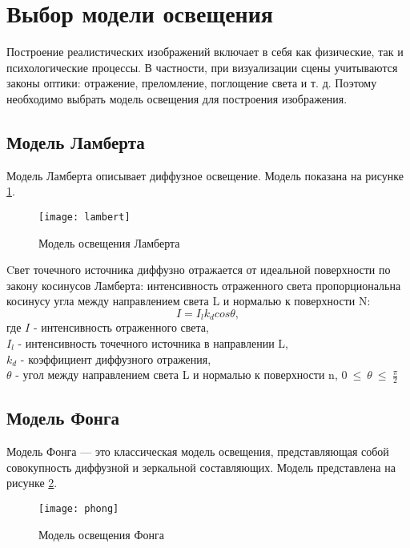\section{Выбор модели освещения}

Построение реалистических изображений включает в себя как физические,
так и психологические процессы. В частности, при визуализации сцены
учитываются законы оптики: отражение, преломление, поглощение света и т. д.
Поэтому необходимо выбрать модель освещения для построения изображения.

\subsection{Модель Ламберта}

Модель Ламберта описывает диффузное освещение. Модель показана на рисунке \ref{lambert}.

\begin{figure}[H]
	\centering
	\texttt{[image: lambert]}
	\caption{Модель освещения Ламберта}
	\label{lambert}
\end{figure}

Cвет точечного источника диффузно отражается от идеальной поверхности по закону косинусов Ламберта: интенсивность отраженного света пропорциональна косинусу угла между направлением света L и нормалью к поверхности N:
\begin{equation}\label{lambert_eq}
	I = I_l k_d cos \theta,
\end{equation}
где $I$ - интенсивность отраженного света,\\
\text{~~~~~}$I_l$ - интенсивность точечного источника в направлении L,\\
\text{~~~~~}$k_d$ - коэффициент диффузного отражения,\\
\text{~~~~~}$\theta$ - угол между направлением света L и нормалью к поверхности n, $0~\le~\theta~\le~\frac{\pi}{2}$

\subsection{Модель Фонга}

Модель Фонга — это классическая модель освещения, представляющая
собой совокупность диффузной и зеркальной составляющих. Модель представлена на рисунке \ref{phong}.

\begin{figure}[H]
	\centering
	\texttt{[image: phong]}
	\caption{Модель освещения Фонга}
	\label{phong}
\end{figure}

